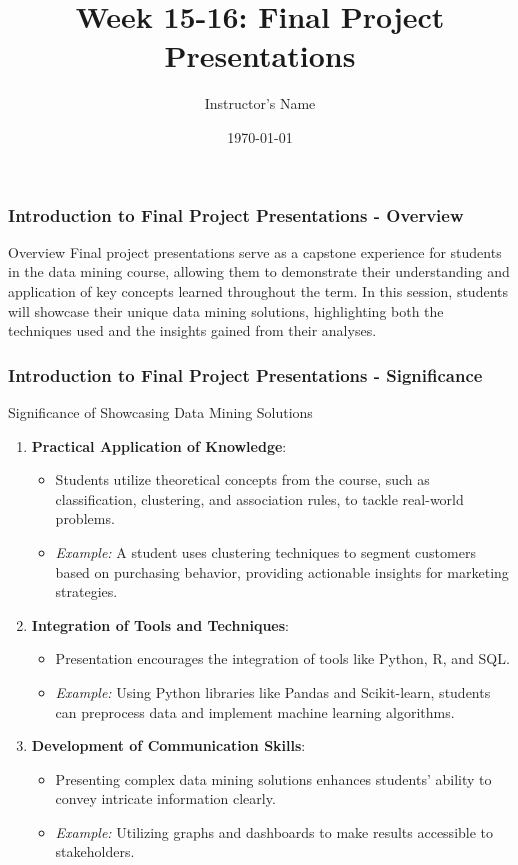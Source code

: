 \documentclass[aspectratio=169]{beamer}
\title[Final Project Presentations]{Week 15-16: Final Project Presentations}
\author[Instructor's Name]{Instructor's Name}
\institute[University Name]{Department of Computer Science \\ University Name}
\date{\today}
\begin{document}
\frame{\titlepage}

\begin{frame}[fragile]
    \frametitle{Introduction to Final Project Presentations - Overview}
    \begin{block}{Overview}
        Final project presentations serve as a capstone experience for students in the data mining course, allowing them to demonstrate their understanding and application of key concepts learned throughout the term. 
        In this session, students will showcase their unique data mining solutions, highlighting both the techniques used and the insights gained from their analyses.
    \end{block}
\end{frame}

\begin{frame}[fragile]
    \frametitle{Introduction to Final Project Presentations - Significance}
    \begin{block}{Significance of Showcasing Data Mining Solutions}
        \begin{enumerate}
            \item \textbf{Practical Application of Knowledge}:
                \begin{itemize}
                    \item Students utilize theoretical concepts from the course, such as classification, clustering, and association rules, to tackle real-world problems.
                    \item \textit{Example:} A student uses clustering techniques to segment customers based on purchasing behavior, providing actionable insights for marketing strategies.
                \end{itemize}
            
            \item \textbf{Integration of Tools and Techniques}:
                \begin{itemize}
                    \item Presentation encourages the integration of tools like Python, R, and SQL.
                    \item \textit{Example:} Using Python libraries like Pandas and Scikit-learn, students can preprocess data and implement machine learning algorithms.
                \end{itemize}
                
            \item \textbf{Development of Communication Skills}:
                \begin{itemize}
                    \item Presenting complex data mining solutions enhances students’ ability to convey intricate information clearly.
                    \item \textit{Example:} Utilizing graphs and dashboards to make results accessible to stakeholders.
                \end{itemize}
                

\end{enumerate}
\end{block}
\end{frame}
\end{document}
